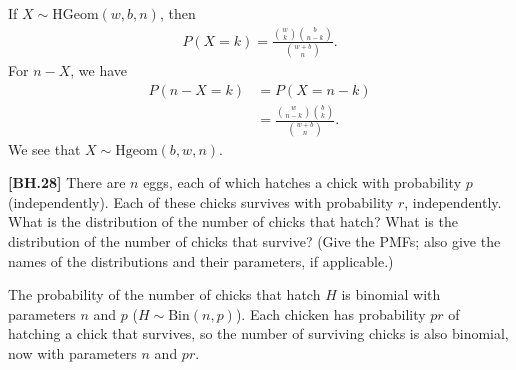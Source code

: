 
\setcounter{theorem}{25}
\begin{exercise}[BH.3.26]
\begin{solution}
	If $X\sim \text{HGeom}(w,b,n)$, then 
    \begin{align*}
    	P(X=k) = \frac{{w \choose k}{b \choose n-k}}{{w+b \choose n}}.
    \end{align*}
    For $n-X$, we have
    \begin{align*}
    	P(n-X=k) & = P(X=n-k)\\
    	& =   \frac{{w \choose n-k}{b \choose k}}{{w+b \choose n}}.
    \end{align*}
    We see that $X\sim\text{Hgeom}(b,w,n)$.
\end{solution}
\end{exercise}

\begin{exercise}
	\textbf{[BH.28]} There are $n$ eggs, each of which hatches a chick with probability $p$ (independently). Each of these chicks survives with probability $r$, independently. What is the distribution of the number of chicks that hatch? What is the distribution of the number of chicks that survive? (Give the PMFs; also give the names of the distributions and their parameters, if applicable.)
\begin{solution}
	The probability of the number of chicks that hatch $H$ is binomial with parameters $n$ and $p$ ($H\sim \text{Bin}(n,p)$). Each chicken has probability $pr$ of hatching a chick that survives, so the number of surviving chicks is also binomial, now with parameters $n$ and $pr$.
\end{solution}
\end{exercise}


